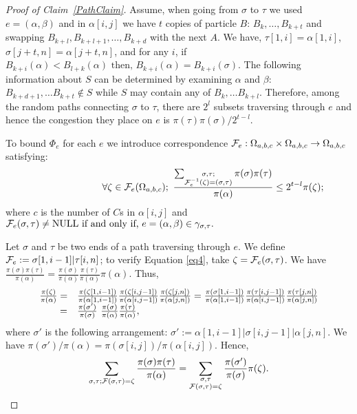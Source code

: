 \documentclass[10 pt]{article}
\begin{document}
\begin{proof}[Proof of Claim~\ref{PathClaim}]
Assume, when going from $\sigma$ to $\tau$ we used  $e=(\alpha,\beta)$ and in $\alpha[i,j]$ we have $t$ copies of particle $B$:
$B_k, \dots , B_{k{+}t}$ and swapping  $B_{k+l}, B_{k+l+1},\dots , B_{k+d}$  with the next $A$.  We have,
$\tau[1,i]=\alpha[1,i]$, $\sigma[j+t,n]=\alpha[j+t,n]$, and for any $i$, if
$ B_{k+i}(\alpha)<B_{l+k}(\alpha) \text{ then, }  B_{k+i}(\alpha)=B_{k+i}(\sigma)$. 
The following information about $S$ can be determined by examining $\alpha$ and $\beta$: $B_{k+d+1},\dots B_{k+t}\notin S$
while $S$ may contain any of $B_{k},\dots B_{k+l}$. Therefore, among the random paths connecting $\sigma$ to $\tau$,
there are $2^l$ subsets traversing through $e$ and hence the congestion they place on 
$e$ is $\pi(\tau)\pi(\sigma)/2^{t-l}$.

 \smallskip

To bound  $\Phi_{e}$ for each $e$ we introduce correspondence 
${\cal F}_e:\Omega_{a,b,c}\times \Omega_{a,b,c}\rightarrow \Omega_{a,b,c}$  satisfying:
\begin{equation}\label{eq4} \hspace{2.5cm}
\forall \zeta\in {\cal F}_e(\Omega_{a,b,c}); ~\frac{\sum_{\substack{\sigma,\tau;\\ {\cal F}^{-1}_{e}(\zeta)=(\sigma,\tau)}} \pi (\sigma)\pi(\tau) }{\pi(\alpha)}\leq 2^{t-l}  \pi(\zeta); 
\end{equation}
where $c$ is the number of $C$s in $\alpha[i,j]$ and ${\cal F}_e (\sigma,\tau) \neq \mbox{NULL} \text{ if and only if, }
e=(\alpha,\beta) \in \gamma_{\sigma,\tau}.$

Let $\sigma$ and $\tau$ be two ends of a path traversing through  $e$. We define ${\cal F}_e := \sigma[1,i-1]\vert \tau[i,n]$;
to verify Equation \ref{eq4}, take $\zeta= {\cal F}_e(\sigma,\tau)$. We have
$
\frac{\pi(\sigma)\pi(\tau)}{\pi(\alpha)}= \frac{\pi(\sigma)}{\pi(\alpha)}\frac{\pi(\tau)}{\pi(\alpha)}\pi(\alpha).
$
Thus,
$$
\begin{array}{ll}
 \frac{\pi(\zeta)}{\pi(\alpha)} =&\frac{\pi(\zeta[1,i-1])}{\pi(\alpha[1,i-1])} \frac{\pi(\zeta[i,j-1])}{\pi(\alpha[i,j-1])} \frac{\pi(\zeta[j,n])}{\pi(\alpha[j,n])} =\frac{\pi(\sigma[1,i-1])}{\pi(\alpha[1,i-1])} \frac{\pi(\tau[i,j-1])}{\pi(\alpha[i,j-1])} \frac{\pi(\tau[j,n])}{\pi(\alpha[j,n])}\\
\hspace{0.75cm}=&\frac{\pi(\sigma')}{\pi(\sigma)} ~ \frac{\pi(\sigma)}{\pi(\alpha)} \frac{\pi(\tau)}{\pi(\alpha)},
\end{array}$$
where  $\sigma'$ is the following arrangement: $\sigma':=\alpha[1,i-1]\vert\sigma[i,j-1]\vert\alpha[j,n]$.
We have $\pi(\sigma')/\pi(\alpha)=\pi(\sigma[i,j])/\pi(\alpha[i,j])$. Hence, 
$$
\sum_{\sigma,\tau; {\cal F}(\sigma,\tau)=\zeta} \frac{\pi(\sigma)\pi(\tau)}{\pi(\alpha)}= 
\sum_{\substack{\sigma,\tau\\ {\cal F}(\sigma,\tau)=\zeta}} \frac{\pi(\sigma')}{\pi(\sigma)} \pi(\zeta).
$$


\end{proof}
\end{document}
